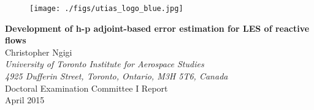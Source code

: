 \documentclass[titlepage,11pt,letterpaper]{article}
\numberwithin{equation}{subsection}
\begin{document}
\newcommand*{\titleRR}
{\begingroup
  \centering
  \vfill
  \begin{figure}
    \vspace{1.5cm}
    \begin{center}
      \texttt{[image: ./figs/utias\_logo\_blue.jpg]}
    \end{center}
    \vspace{1.5cm}
  \end{figure}
  {\LARGE \textbf{Development of h-p adjoint-based error estimation for LES of reactive flows}}\\
  \vspace*{2.0cm}
  {\large Christopher Ngigi}\\
  \vspace*{1.cm}
  {\normalsize\itshape University of
    Toronto Institute for Aerospace Studies}\\
  {\normalsize\itshape 4925
    Dufferin Street, Toronto, Ontario, M3H 5T6, Canada}\\
  \vspace*{2.cm}
  {Doctoral Examination Committee I Report} \\
  \vspace*{1.cm}
  {April 2015}
  \vfill\null
\endgroup}

\thispagestyle{empty}\titleRR
\clearpage
\setcounter{page}{1}


\newpage





\end{document}
